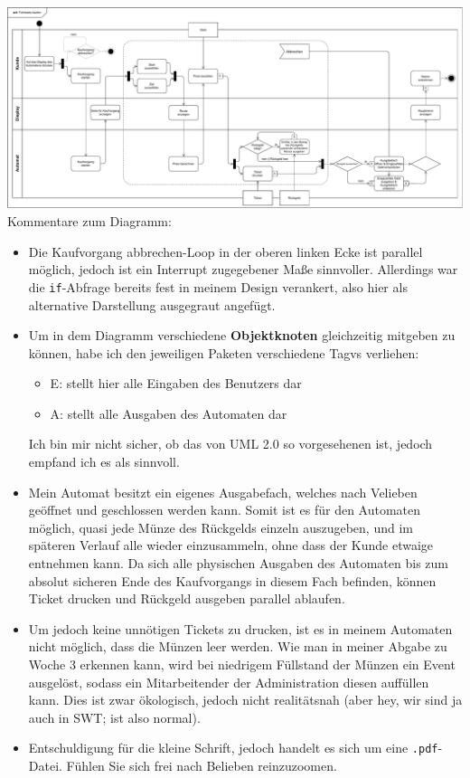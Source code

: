 \documentclass{article}
\newcommand{\gqq}[1]{\glqq{}#1\grqq{}}
\begin{document}
\begin{enumerate}[label=\alph*.]
            \includegraphics[width=\textwidth]{swt_wende_tim_h04_activity_diagram.pdf}
            Kommentare zum Diagramm:
            \begin{itemize}
                \item Die \gqq{Kaufvorgang abbrechen}-Loop in der oberen linken Ecke ist parallel möglich, jedoch ist ein Interrupt zugegebener Maße sinnvoller.
                    Allerdings war die \texttt{if}-Abfrage bereits fest in meinem Design verankert, also hier als alternative Darstellung ausgegraut angefügt.
                \item Um in dem Diagramm verschiedene \textbf{Objektknoten} gleichzeitig mitgeben zu können, habe ich den jeweiligen Paketen verschiedene Tagvs verliehen:
                    \begin{itemize}
                        \item E: stellt hier alle Eingaben des Benutzers dar
                        \item A: stellt alle Ausgaben des Automaten dar
                    \end{itemize}
                    Ich bin mir nicht sicher, ob das von UML 2.0 so vorgesehenen ist, jedoch empfand ich es als sinnvoll.
                \item Mein Automat besitzt ein eigenes Ausgabefach, welches nach Velieben geöffnet und geschlossen werden kann.
                    Somit ist es für den Automaten möglich, quasi jede Münze des Rückgelds einzeln auszugeben, und im späteren Verlauf alle wieder einzusammeln, ohne dass der Kunde etwaige entnehmen kann.
                    Da sich alle physischen Ausgaben des Automaten bis zum absolut sicheren Ende des Kaufvorgangs in diesem Fach befinden, können \gqq{Ticket drucken} und \gqq{Rückgeld ausgeben} parallel ablaufen.
                \item Um jedoch keine unnötigen Tickets zu drucken, ist es in meinem Automaten nicht möglich, dass die Münzen leer werden.
                    Wie man in meiner Abgabe zu Woche 3 erkennen kann, wird bei niedrigem Füllstand der Münzen ein Event ausgelöst, sodass ein Mitarbeitender der Administration diesen auffüllen kann.
                    Dies ist zwar ökologisch, jedoch nicht realitätsnah (aber hey, wir sind ja auch in SWT; ist also normal).
                \item Entschuldigung für die kleine Schrift, jedoch handelt es sich um eine \texttt{.pdf}-Datei.
                    Fühlen Sie sich frei nach Belieben reinzuzoomen.
            \end{itemize}


\end{enumerate}
\end{document}
